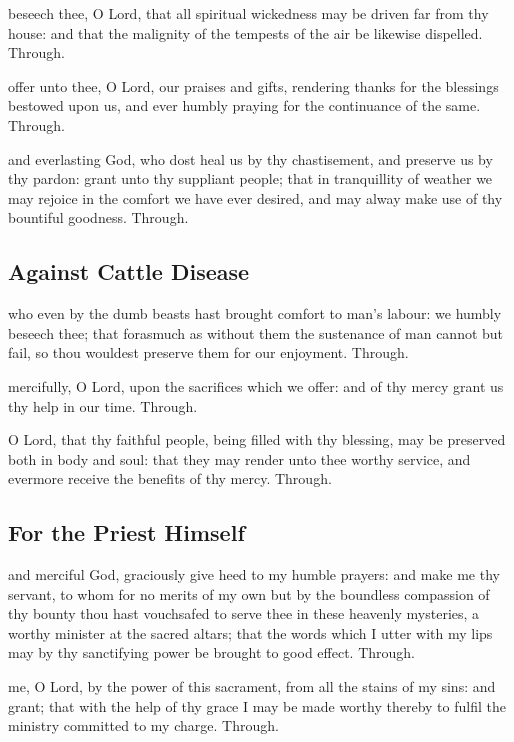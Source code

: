 \begin{multicols}{2}
\collect
{} beseech thee, O Lord, that all spiritual wickedness may be driven far from thy house: and that the malignity of the tempests of the air be likewise dispelled. Through.

\secret
{} offer unto thee, O Lord, our praises and gifts, rendering thanks for the blessings bestowed upon us, and ever humbly praying for the continuance of the same. Through.

\postcommunion
{} and everlasting God, who dost heal us by thy chastisement, and preserve us by thy pardon: grant unto thy suppliant people; that in tranquillity of weather we may rejoice in the comfort we have ever desired, and may alway make use of thy bountiful goodness. Through.

\subsection{Against Cattle Disease}

\collect
{} who even by the dumb beasts hast brought comfort to man's labour: we humbly beseech thee; that forasmuch as without them the sustenance of man cannot but fail, so thou wouldest preserve them for our enjoyment. Through.

\secret
{} mercifully, O Lord, upon the sacrifices which we offer: and of thy mercy grant us thy help in our time. Through.

\postcommunion
{} O Lord, that thy faithful people, being filled with thy blessing, may be preserved both in body and soul: that they may render unto thee worthy service, and evermore receive the benefits of thy mercy. Through.


   \newcolumn

\subsection{For the Priest Himself}

\collect
{} and merciful God, graciously give heed to my humble prayers: and make me thy servant, to whom for no merits of my own but by the boundless compassion of thy bounty thou hast vouchsafed to serve thee in these heavenly mysteries, a worthy minister at the sacred altars; that the words which I utter with my lips may by thy sanctifying power be brought to good effect. Through.

\secret
{} me, O Lord, by the power of this sacrament, from all the stains of my sins: and grant; that with the help of thy grace I may be made worthy thereby to fulfil the ministry committed to my charge. Through.


\end{multicols}
